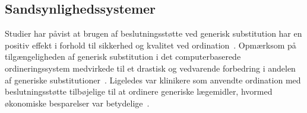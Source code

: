 \subsection{Sandsynlighedssystemer}


Studier har påvist at brugen af beslutningsstøtte ved generisk substitution har en positiv effekt i forhold til sikkerhed og kvalitet ved ordination~\citep{Stenner2010, Fischer2008}. Opmærksom på tilgængeligheden af generisk substitution i det computerbaserede ordineringssystem medvirkede til et drastisk og vedvarende forbedring i andelen af generiske substitutioner~\citep{Stenner2010}. Ligeledes var klinikere som anvendte ordination med beslutningsstøtte tilbøjelige til at ordinere generiske lægemidler, hvormed økonomiske besparelser var betydelige~\citep{Fischer2008}. %